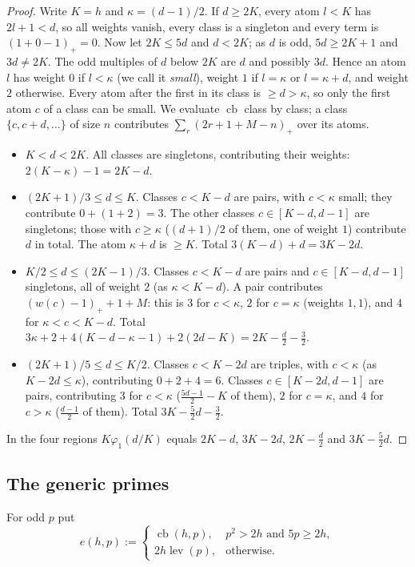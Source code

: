 \documentclass[11pt]{amsart}
\theoremstyle{definition}
\theoremstyle{remark}
\numberwithin{equation}{section}
\newcommand{\lev}{\operatorname{lev}}
\newcommand{\cb}{\operatorname{cb}}
\begin{document}
\begin{proof}
Write $K=h$ and $\kappa=(d-1)/2$. If $d\ge2K$, every atom $l<K$ has $2l+1<d$, so all weights vanish, every class is a
singleton and every term is $(1+0-1)_+=0$. Now let $2K\le5d$ and $d<2K$; as $d$ is odd, $5d\ge2K+1$ and $3d\ne2K$. The
odd multiples of $d$ below $2K$ are $d$ and possibly $3d$. Hence an atom $l$ has weight $0$ if $l<\kappa$ (we call it
\emph{small}), weight $1$ if $l=\kappa$ or $l=\kappa+d$, and weight $2$ otherwise. Every atom after the first in its
class is $\ge d>\kappa$, so only the first atom $c$ of a class can be small. We evaluate $\cb$ class by class; a class
$\{c,c+d,\dots\}$ of size $n$ contributes $\sum_r(2r+1+M-n)_+$ over its atoms.
\begin{itemize}
\item[(IV)] $K<d<2K$. All classes are singletons, contributing their weights: $2(K-\kappa)-1=2K-d$.
\item[(III)] $(2K+1)/3\le d\le K$. Classes $c<K-d$ are pairs, with $c<\kappa$ small; they contribute $0+(1+2)=3$.
  The other classes $c\in[K-d,d-1]$ are singletons; those with $c\ge\kappa$ ($(d+1)/2$ of them, one of weight $1$)
  contribute $d$ in total. The atom $\kappa+d$ is $\ge K$. Total $3(K-d)+d=3K-2d$.
\item[(II)] $K/2\le d\le(2K-1)/3$. Classes $c<K-d$ are pairs and $c\in[K-d,d-1]$ singletons, all of weight $2$ (as
  $\kappa<K-d$). A pair contributes $(w(c)-1)_++1+M$: this is $3$ for $c<\kappa$, $2$ for $c=\kappa$ (weights
  $1,1$), and $4$ for $\kappa<c<K-d$. Total $3\kappa+2+4(K-d-\kappa-1)+2(2d-K)=2K-\frac d2-\frac32$.
\item[(I)] $(2K+1)/5\le d\le K/2$. Classes $c<K-2d$ are triples, with $c<\kappa$ (as $K-2d\le\kappa$), contributing
  $0+2+4=6$. Classes $c\in[K-2d,d-1]$ are pairs, contributing $3$ for $c<\kappa$ ($\frac{5d-1}2-K$ of them), $2$ for
  $c=\kappa$, and $4$ for $c>\kappa$ ($\frac{d-1}2$ of them). Total $3K-\frac52d-\frac32$.
\end{itemize}
In the four regions $K\varphi_1(d/K)$ equals $2K-d$, $3K-2d$, $2K-\frac d2$ and $3K-\frac52d$.
\end{proof}

\subsection{The generic primes}
For odd $p$ put
\[
  e(h,p):=\begin{cases}\cb(h,p),& p^2>2h\text{ and }5p\ge2h,\\ 2h\lev(p),&\text{otherwise.}\end{cases}
\]
\end{document}
